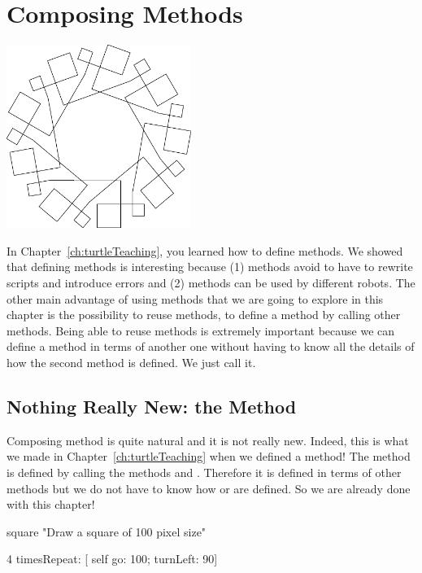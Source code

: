 \ifx\wholebook\relax\else



\fi

\chapter{Composing Methods}\label{ch:composons}

\begin{chapterfigure}
\includegraphics[width=6cm]{compArtNouveauTurningScr}
\end{chapterfigure}

In  Chapter~\ref{ch:turtleTeaching}, you learned how to define methods. We showed that defining methods is interesting because (1) methods avoid to have to rewrite scripts and introduce errors and (2) methods can be used by different robots. The other main advantage of using methods that we are going to explore in this chapter is the possibility to reuse methods, \ie to define a method by calling other methods. Being able to reuse methods is extremely important because we can define a method in terms of another one without having to know all the details of how the second method is defined.  We just call it.

\section{Nothing Really New: the  Method}
Composing method is quite natural and it is not really new. Indeed, this is what we made in Chapter~\ref{ch:turtleTeaching} when we defined a method! The method  is defined by calling the methods \turnLeft and \timesRepeat. Therefore it is defined in terms of other
methods but we do not have to know how \turnLeft or \timesRepeat are defined. So we are already done with this chapter!

\begin{method}\label{comp:square}
square 
   "Draw a square of 100 pixel size"

   4 timesRepeat: 
         [ self go: 100;
                  turnLeft: 90]
\end{method}


